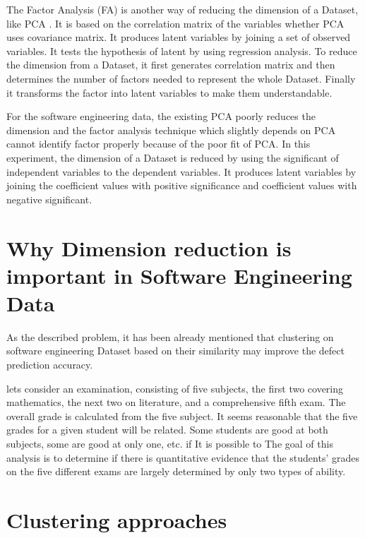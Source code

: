 \documentclass[12pt]{report}
\begin{document}
The Factor Analysis (FA) is another way of reducing the dimension of a Dataset, like PCA \cite{malinowski2002factor,kim1978introduction}. It is based on the correlation matrix of the variables whether PCA uses covariance matrix. It produces latent variables by joining a set of observed variables. It tests the hypothesis of latent by using regression analysis. To reduce the dimension from a Dataset, it first generates correlation matrix and then determines the number of factors needed to represent the whole Dataset. Finally it transforms the factor into latent variables to make them understandable.


For the software engineering data, the existing PCA poorly reduces the dimension and the factor analysis technique which slightly depends on PCA cannot identify factor properly because of the poor fit of PCA. In this experiment, the dimension of a Dataset is reduced by using the significant of independent variables to the dependent variables. It produces latent variables by joining the coefficient values with positive significance and coefficient values with negative significant. 


\section{Why Dimension reduction is important in Software Engineering Data}

As the described problem, it has been already mentioned that clustering on software engineering Dataset based on their similarity may improve the defect prediction accuracy. 

lets consider an examination, consisting of five subjects, the first two covering mathematics, the next two on literature, and a comprehensive fifth exam. The overall grade is calculated from the five subject. It seems reasonable that the five grades for a given student will be related. Some students are good at both subjects, some are good at only one, etc. if It is possible to  The goal of this analysis is to determine if there is quantitative evidence that the students' grades on the five different exams are largely determined by only two types of ability.

  
\section{Clustering approaches}
 
\end{document}
